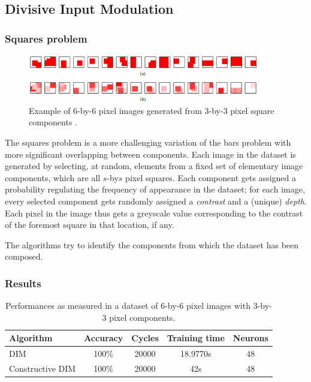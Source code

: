\documentclass[11pt,a4paper]{report}
\begin{document}
			\subsection{Divisive Input Modulation}
				\subsubsection{Squares problem}
				\begin{figure}[h]
					\centering
					\includegraphics[width=0.9\textwidth]{squares}
					\caption{Example of 6-by-6 pixel images generated from 3-by-3 pixel square components \cite{spratling2009unsupervised}.}
					\label{fig:error}
				\end{figure}
				The squares problem is a more challenging variation of the bars problem with more significant overlapping between components. Each image in the dataset is generated by selecting, at random, elements from a fixed set of elementary image components, which are all $s$-by$s$ pixel squares. Each component gets assigned a probability regulating the frequency of appearance in the dataset; for each image, every selected component gets randomly assigned a \emph{contrast} and a (unique) \emph{depth}. Each pixel in the image thus gets a greyscale value corresponding to the contrast of the foremost square in that location, if any.
				
				The algorithms try to identify the components from which the dataset has been composed.
				
				\subsubsection{Results}
				\begin{table}[h]
					\centering
					\begin{tabular}{l*{4}{c}}
						Algorithm         & Accuracy & Cycles & Training time & Neurons \\
						\hline
						DIM               & 100\%    & 20000  & 18.9770s      & 48      \\
						Constructive DIM  & 100\%    & 20000  & 42s           & 48      \\
					\end{tabular}
					\caption{Performances as measured in a dataset of 6-by-6 pixel images with 3-by-3 pixel components.}
					\label{tab:performance}
				\end{table}
				
\end{document}
